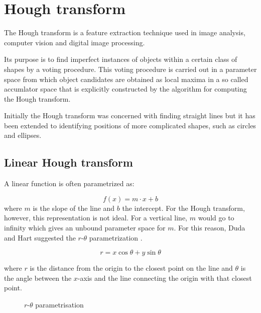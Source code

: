 \documentclass[11pt]{scrreprt}
\begin{document}



\section{Hough transform} %
\label{sec:hough_transform}

The Hough transform \cite{Duda:1972} is a feature extraction technique used in image analysis, computer vision and digital image processing.

Its purpose is to find imperfect instances of objects within a certain class of shapes by a voting procedure. This voting procedure is 
carried out in a parameter space from which object candidates are obtained as local maxima in a so called accumlator space that is 
explicitly constructed by the algorithm for computing the Hough transform.

Initially the Hough transform was concerned with finding straight lines \cite{c1962method} but it has been extended to identifying positions 
of more complicated shapes, such as circles and ellipses.

\subsection{Linear Hough transform} %
\label{sub:linear_hough_transform}

A linear function is often parametrized as:

\[
  f(x) = m\cdot x + b
\]
where $m$ is the slope of the line and $b$ the intercept. For the Hough transform, however, this representation is not ideal. For a 
vertical line, $m$ would go to infinity which gives an unbound parameter space for $m$. For this reason, Duda and Hart suggested the 
$r\text{-}\theta$ parametrization \parencite{Duda:1972}.

\begin{equation}
  r = x\cos\theta + y\sin\theta\label{eq:param_eq}
\end{equation}

where $r$ is the distance from the origin to the closest point on the line and $\theta$ is the angle between the $x$-axis and the line 
connecting the origin with that closest point.

\begin{figure}[ht]
  \centering
  \caption{$r\text{-}\theta$ parametrisation}
  \label{fig:rhotheta}
\end{figure}
\end{document}
